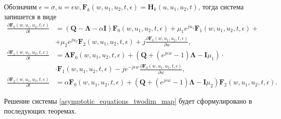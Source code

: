 Обозначим $\epsilon = \sigma,   u= \epsilon w,   \boldsymbol{F}_{k}(w,u_{1},u_{2},t,\epsilon) = \boldsymbol{H}_{k}(u,u_{1},u_{2},t)$, тогда система запишется в виде
\begin{equation} \label{asymptotic_equations_twodim_map}
	\begin{split}
		\frac{{\partial \boldsymbol{F}_{0}(w,u_{1},u_{2},t,\epsilon)}}{{\partial t}} &= (\boldsymbol{Q}-\boldsymbol{\Lambda}-\alpha\boldsymbol{I})\boldsymbol{F}_{0}(w,u_{1},u_{2},t,\epsilon) + \mu_{1} e^{ju_{1}}\boldsymbol{F}_{1}(w,u_{1},u_{2},t,\epsilon)  + \\  &+ \mu_{2}e^{ju_{2}}\boldsymbol{F}_{2}(w,u_{1},u_{2},t,\epsilon) + j
	\frac{{\partial \boldsymbol{F}_{0}(w,u_{1},u_{2},t,\epsilon)}}{{\partial w}},
	\\
	\frac{{\partial \boldsymbol{F}_{1}(w,u_{1},u_{2},t,\epsilon)}}{{\partial t}} &= \boldsymbol{\Lambda} \boldsymbol{F}_{0}(w,u_{1},u_{2},t,\epsilon) +  (\boldsymbol{Q}+(e^{j\epsilon w}-1)\boldsymbol{\Lambda} - \boldsymbol{I}\mu_{1})\cdot \\ &\cdot \boldsymbol{F}_{1}(w,u_{1},u_{2},t,\epsilon) - j e^{-j\epsilon w}
	\frac{{\partial \boldsymbol{F}_{0}(w,u_{1},u_{2},t,\epsilon)}}{{\partial w}},
	\\
	\frac{{\partial \boldsymbol{F}_{2}(w,u_{1},u_{2},t,\epsilon)}}{{\partial t}} &= \alpha \boldsymbol{F}_{0}(w,u_{1},u_{2},t,\epsilon) + (\boldsymbol{Q}+(e^{j\epsilon w}-1)\boldsymbol{\Lambda} - \boldsymbol{I}\mu_{2})\boldsymbol{F}_{2}(w,u_{1},u_{2},t,\epsilon).
	\end{split}
\end{equation}  

Решение системы \eqref{asymptotic_equations_twodim_map} будет сформулировано в последующих теоремах.

